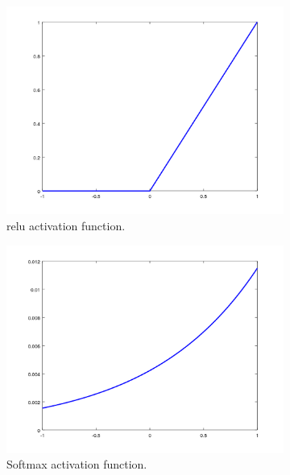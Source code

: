 \begin{description}
	\begin{figure}
		\centering
		\begin{subfigure}{0.5\textwidth}
			\centering
			\includegraphics[width=1\linewidth]{figures/relu.png}
			\caption{\gls{relu} activation function.}\label{fig:relu}
		\end{subfigure}%
		\begin{subfigure}{0.5\textwidth}
			\centering
			\includegraphics[width=1\linewidth]{figures/softmax.png}
			\caption{Softmax activation function.}\label{fig:softmax}
		\end{subfigure}
		\caption[Activation functions.]{}
		\label{fig:activations}
	\end{figure}
	
\end{description}


